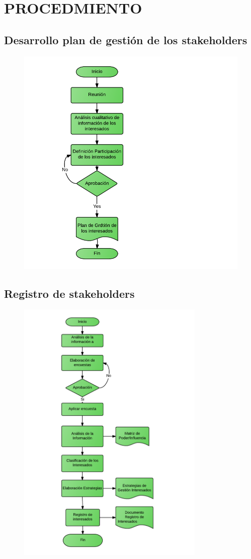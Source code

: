 \chapter{PROCEDMIENTO}
%
\section{Desarrollo plan de gesti\'on de los stakeholders}
%
\begin{figure}[H]
    \centering
    \includegraphics[width=1\textwidth]{images/gestion.png}
\end{figure}
%
\section{Registro de stakeholders}
%
\begin{figure}[H]
    \centering
    \includegraphics[width=0.8\textwidth]{images/registro.png}
\end{figure}